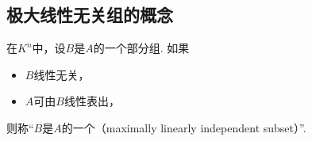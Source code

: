 
\subsection{极大线性无关组的概念}
\begin{definition}\label{definition:线性方程组.极大线性无关组的定义}
在\(K^n\)中，设\(B\)是\(A\)的一个部分组.
如果\begin{itemize}
	\item \(B\)线性无关，
	\item \(A\)可由\(B\)线性表出，
\end{itemize}
则称“\(B\)是\(A\)的一个（maximally linearly independent subset）”.
\end{definition}

